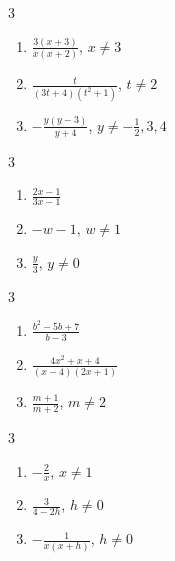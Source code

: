\documentclass{ximera}
\begin{document}
	\author{Stitz-Zeager}


\begin{multicols}{3}
\begin{enumerate}

\item $\frac{3(x+3)}{x(x+2)}$, $x \neq 3$
\item $\frac{t}{(3t+4)(t^2+1)}$, $t \neq 2$
\item $-\frac{y(y-3)}{y+4}$, $y \neq -\frac{1}{2}, 3, 4$ 

\setcounter{HW}{\value{enumi}}
\end{enumerate}
\end{multicols}

\begin{multicols}{3}
\begin{enumerate}
\setcounter{enumi}{\value{HW}}

\item  $\frac{2x-1}{3x-1}$
\item  $-w-1$, $w \neq 1$
\item  $\frac{y}{3}$, $y \neq 0$
 

\setcounter{HW}{\value{enumi}}
\end{enumerate}
\end{multicols}

\begin{multicols}{3}
\begin{enumerate}
\setcounter{enumi}{\value{HW}}

\item  $\frac{b^2-5b+7}{b-3}$
\item  $\frac{4x^2+x+4}{(x-4)(2x+1)}$
\item  $\frac{m+1}{m+2}$, $m \neq 2$

\setcounter{HW}{\value{enumi}}
\end{enumerate}
\end{multicols}

\begin{multicols}{3}
\begin{enumerate}
\setcounter{enumi}{\value{HW}}

\item $-\frac{2}{x}$, $x \neq 1$
\item $\frac{3}{4-2h}$, $h \neq 0$
\item $-\frac{1}{x(x+h)}$, $h \neq 0$

\setcounter{HW}{\value{enumi}}
\end{enumerate}
\end{multicols}
\end{document}
